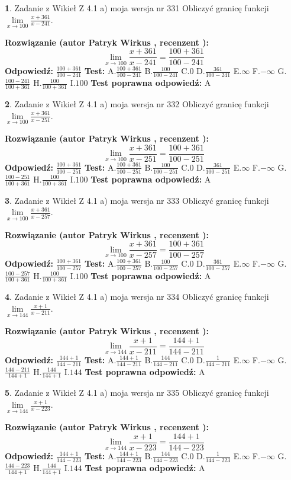 \documentclass[12pt, a4paper]{article}
\theoremstyle{definition} %
\newtheorem{zad}{}
\newcommand{\zadStart}[1]{\begin{zad}#1\newline}
\newcommand{\zadStop}{\end{zad}}
\newcommand{\rozwStart}[2]{\noindent \textbf{Rozwiązanie (autor #1 , recenzent #2): }\newline}
\newcommand{\rozwStop}{\newline}
\newcommand{\odpStart}{\noindent \textbf{Odpowiedź:}\newline}
\newcommand{\odpStop}{\newline}
\newcommand{\testStart}{\noindent \textbf{Test:}\newline}
\newcommand{\testStop}{\newline}
\newcommand{\kluczStart}{\noindent \textbf{Test poprawna odpowiedź:}\newline}
\newcommand{\kluczStop}{\newline}
\begin{document}
\zadStart{Zadanie z Wikieł Z 4.1 a) moja wersja nr 331}
Obliczyć granicę funkcji $\lim\limits_{x\to100}\frac{x+361}{x-241}$.
\zadStop
\rozwStart{Patryk Wirkus}{}
$$\lim\limits_{x\to100}\frac{x+361}{x-241} = \frac{100+361}{100-241}$$
\rozwStop
\odpStart
$\frac{100+361}{100-241}$
\odpStop
\testStart
A.$\frac{100+361}{100-241}$
B.$\frac{100}{100-241}$
C.$0$
D.$\frac{361}{100-241}$
E.$\infty$
F.$-\infty$
G.$\frac{100-241}{100+361}$
H.$\frac{100}{100+361}$
I.$100$
\testStop
\kluczStart
A
\kluczStop



\zadStart{Zadanie z Wikieł Z 4.1 a) moja wersja nr 332}
Obliczyć granicę funkcji $\lim\limits_{x\to100}\frac{x+361}{x-251}$.
\zadStop
\rozwStart{Patryk Wirkus}{}
$$\lim\limits_{x\to100}\frac{x+361}{x-251} = \frac{100+361}{100-251}$$
\rozwStop
\odpStart
$\frac{100+361}{100-251}$
\odpStop
\testStart
A.$\frac{100+361}{100-251}$
B.$\frac{100}{100-251}$
C.$0$
D.$\frac{361}{100-251}$
E.$\infty$
F.$-\infty$
G.$\frac{100-251}{100+361}$
H.$\frac{100}{100+361}$
I.$100$
\testStop
\kluczStart
A
\kluczStop



\zadStart{Zadanie z Wikieł Z 4.1 a) moja wersja nr 333}
Obliczyć granicę funkcji $\lim\limits_{x\to100}\frac{x+361}{x-257}$.
\zadStop
\rozwStart{Patryk Wirkus}{}
$$\lim\limits_{x\to100}\frac{x+361}{x-257} = \frac{100+361}{100-257}$$
\rozwStop
\odpStart
$\frac{100+361}{100-257}$
\odpStop
\testStart
A.$\frac{100+361}{100-257}$
B.$\frac{100}{100-257}$
C.$0$
D.$\frac{361}{100-257}$
E.$\infty$
F.$-\infty$
G.$\frac{100-257}{100+361}$
H.$\frac{100}{100+361}$
I.$100$
\testStop
\kluczStart
A
\kluczStop



\zadStart{Zadanie z Wikieł Z 4.1 a) moja wersja nr 334}
Obliczyć granicę funkcji $\lim\limits_{x\to144}\frac{x+1}{x-211}$.
\zadStop
\rozwStart{Patryk Wirkus}{}
$$\lim\limits_{x\to144}\frac{x+1}{x-211} = \frac{144+1}{144-211}$$
\rozwStop
\odpStart
$\frac{144+1}{144-211}$
\odpStop
\testStart
A.$\frac{144+1}{144-211}$
B.$\frac{144}{144-211}$
C.$0$
D.$\frac{1}{144-211}$
E.$\infty$
F.$-\infty$
G.$\frac{144-211}{144+1}$
H.$\frac{144}{144+1}$
I.$144$
\testStop
\kluczStart
A
\kluczStop



\zadStart{Zadanie z Wikieł Z 4.1 a) moja wersja nr 335}
Obliczyć granicę funkcji $\lim\limits_{x\to144}\frac{x+1}{x-223}$.
\zadStop
\rozwStart{Patryk Wirkus}{}
$$\lim\limits_{x\to144}\frac{x+1}{x-223} = \frac{144+1}{144-223}$$
\rozwStop
\odpStart
$\frac{144+1}{144-223}$
\odpStop
\testStart
A.$\frac{144+1}{144-223}$
B.$\frac{144}{144-223}$
C.$0$
D.$\frac{1}{144-223}$
E.$\infty$
F.$-\infty$
G.$\frac{144-223}{144+1}$
H.$\frac{144}{144+1}$
I.$144$
\testStop
\kluczStart
A
\kluczStop
\end{document}
